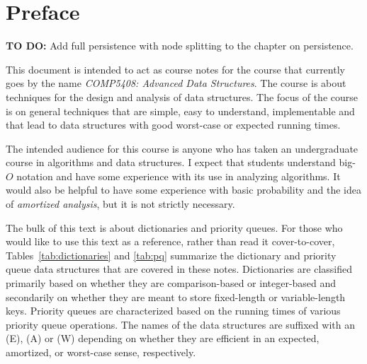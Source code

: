 \chapter*{Preface}


\noindent\textbf{TO DO:} Add full persistence with node splitting to
the chapter on persistence.


This document is intended to act as course notes for the course that
currently goes by the name \emph{COMP5408: Advanced Data Structures}.
The course is about techniques for the design and analysis of data
structures.  The focus of the course is on general techniques that are
simple, easy to understand, implementable and that lead to data
structures with good worst-case or expected running times.

The intended audience for this course is anyone who has taken an
undergraduate course in algorithms and data structures.  I expect that
students understand big-$O$ notation and have some experience with its
use in analyzing algorithms.  It would also be helpful to have some
experience with basic probability and the idea of \emph{amortized
analysis}, but it is not strictly necessary.

The bulk of this text is about dictionaries and priority queues.  For
those who would like to use this text as a reference, rather than read
it cover-to-cover, Tables~\ref{tab:dictionaries} and \ref{tab:pq}
summarize the dictionary and priority queue data structures that are
covered in these notes.  Dictionaries are classified primarily based
on whether they are comparison-based or integer-based and secondarily
on whether they are meant to store fixed-length or variable-length
keys.  Priority queues are characterized based on the running times of
various priority queue operations.  The names of the data structures are
suffixed with an (E), (A) or (W) depending on whether they are efficient
in an expected, amortized, or worst-case sense, respectively.

